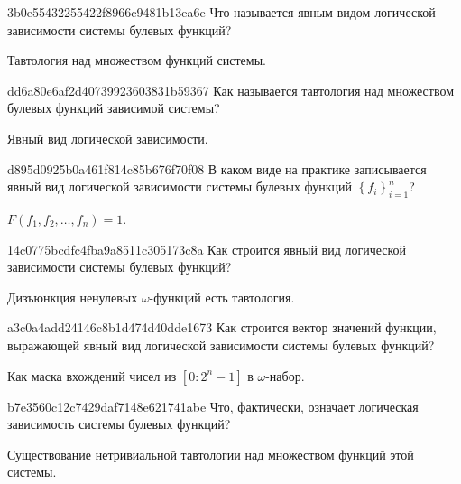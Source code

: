 \begin{note}{3b0e55432255422f8966c9481b13ea6e}
    Что называется явным видом логической зависимости системы булевых функций?

    \begin{cloze}{1}
        Тавтология над множеством функций системы.
    \end{cloze}
\end{note}

\begin{note}{dd6a80e6af2d40739923603831b59367}
    Как называется тавтология над множеством булевых функций зависимой системы?

    \begin{cloze}{1}
        Явный вид логической зависимости.
    \end{cloze}
\end{note}

\begin{note}{d895d0925b0a461f814c85b676f70f08}
    В каком виде на практике записывается явный вид логической зависимости системы булевых функций \({ \left\{ f_i \right\}_{i=1}^{n} }\)?

    \begin{cloze}{1}
        \({ F(f_1, f_2, \ldots, f_n) = 1 }\).
    \end{cloze}
\end{note}

\begin{note}{14c0775bcdfc4fba9a8511c305173c8a}
    Как строится явный вид логической зависимости системы булевых функций?

    \begin{cloze}{1}
        Дизъюнкция ненулевых \({ \omega }\)-функций есть тавтология.
    \end{cloze}
\end{note}

\begin{note}{a3c0a4add24146c8b1d474d40dde1673}
    Как строится вектор значений функции, выражающей явный вид логической зависимости системы булевых функций?

    \begin{cloze}{1}
        Как маска вхождений чисел из \({ [0 : 2^{n}-1] }\) в \({ \omega }\)-набор.
    \end{cloze}
\end{note}

\begin{note}{b7e3560c12c7429daf7148e621741abe}
    Что, фактически, означает логическая зависимость системы булевых функций?

    \begin{cloze}{1}
        Существование нетривиальной тавтологии над множеством функций этой системы.
    \end{cloze}
\end{note}

